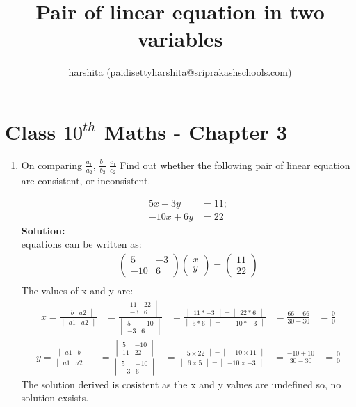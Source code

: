 \documentclass[12pt]{article}
\title{Pair of linear equation in two variables}
\author{harshita (paidisettyharshita@sriprakashschools.com)}
\newcommand{\myvec}[1]{\ensuremath{\begin{pmatrix}#1\end{pmatrix}}}
\newcommand{\mydet}[1]{\ensuremath{\begin{vmatrix}#1\end{vmatrix}}}
\newcommand{\solution}{\noindent \textbf{Solution: }}
\begin{document}
\maketitle
\section*{Class $10^{th}$ Maths - Chapter 3}

\begin{enumerate}
 \item On comparing $\frac{a_1}{a_2}$, $\frac{b_1}{b_2}$ $\frac{c_1}{c_2} $
Find out whether the following pair of linear equation are consistent, or inconsistent.

\begin{align}
5x-3y&=11;\\
-10x+6y&=22
\end{align}
 \solution \\
 equations can be written as:\\

\begin{align}
\myvec{5&-3\\-10&6} \myvec{x\\y} = \myvec{11\\22}\\
\end{align}
The values of x and y are:
\begin{align}
x=\frac{\mydet{b & a2}}{\mydet {a1 &a2}} &=
\frac{\mydet{11&22 \\ -3&6}}{\mydet {5&-10 \\ -3&6}}&=\frac{\mydet{11*-3}-\mydet{22*6}}{\mydet{5*6}-\mydet{-10*-3}}
&=\frac{66-66}{30-30}&=\frac{0}{0}
\end{align}
\begin{align}
 y=\frac{\mydet{ a1 & b}}{\mydet {a1 & a2}}&=
\frac{\mydet{5&-10\\11&22}}{\mydet{5&-10\\-3&6}}&=\frac{\mydet{5\times22}-\mydet{-10\times11}}{\mydet{6\times5}-\mydet{-10\times-3}}
&=\frac{-10+10}{30-30}&=\frac{0}{0}
\end{align}
The solution derived is cosistent as the x and y values are undefined so, no solution exsists.

\end{enumerate}
\end{document}
